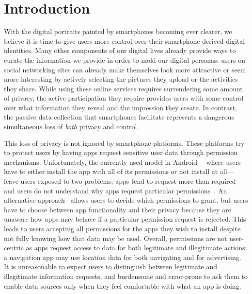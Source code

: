 
\section{Introduction} \label{sec-introduction}

With the digital portraits painted by smartphones becoming ever clearer, we
believe it is time to give users more control over their smartphone-derived
digital identities. Many other components of our digital lives already provide
ways to curate the information we provide in order to mold our digital
personas: users on social networking sites can already make themselves look
more attractive or seem more interesting by actively selecting the pictures
they upload or the activities they share. While using these online services
requires surrendering some amount of privacy, the active participation they
require provides users with some control over what information they reveal and
the impression they create. In contrast, the passive data collection that
smartphones facilitate represents a dangerous simultaneous loss of
\textit{both} privacy and control.


This loss of privacy is not ignored by smartphone platforms. These platforms
try to protect users by having apps request sensitive user data through
permission mechanisms. Unfortunately, the currently used model in Android---
where users have to either install the app with all of its permissions or not
install at all---leave users exposed to two problems: apps tend to request more
than required~\cite{taintdroid-osdi,demystified-ccs11} and users do not
understand why apps request particular permissions~\cite{androidperms-soups12}.
An alternative approach~\cite{apex-asiaccs10} allows users to decide which
permissions to grant, but users have to choose between app functionality and
their privacy because they are unaware how apps may behave if a particular
permission request is rejected. This leads to users accepting all permissions
for the apps they wish to install despite not fully knowing how that data may
be used. Overall, permissions are not user-centric as apps request access to
data for both legitimate and illegitimate actions: a navigation app may use
location data for both navigating and for advertising. It is unreasonable to
expect users to distinguish between legitimate and illegitimate information
requests, and burdensome and error-prone to ask them to enable data sources
only when they feel comfortable with what an app is doing.

